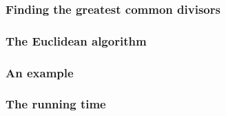 \begin{frame}\frametitle{Finding the greatest common divisors}
\end{frame}

\begin{frame}\frametitle{The Euclidean algorithm}
\end{frame}

\begin{frame}\frametitle{An example}
\end{frame}

\begin{frame}\frametitle{The running time}
\end{frame}

